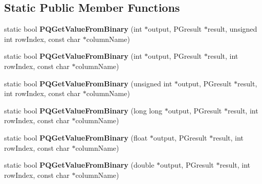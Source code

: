 \subsection*{Static Public Member Functions}
\begin{DoxyCompactItemize}
\item 
\hypertarget{class_postgre_s_q_l_interface_aa3364b9afb4acf6e5d3fc3a25d06094c}{static bool {\bfseries P\-Q\-Get\-Value\-From\-Binary} (int $\ast$output, P\-Gresult $\ast$result, unsigned int row\-Index, const char $\ast$column\-Name)}\label{class_postgre_s_q_l_interface_aa3364b9afb4acf6e5d3fc3a25d06094c}

\item 
\hypertarget{class_postgre_s_q_l_interface_a85cbefe8d04c7b73ce17013965c43077}{static bool {\bfseries P\-Q\-Get\-Value\-From\-Binary} (int $\ast$output, P\-Gresult $\ast$result, int row\-Index, const char $\ast$column\-Name)}\label{class_postgre_s_q_l_interface_a85cbefe8d04c7b73ce17013965c43077}

\item 
\hypertarget{class_postgre_s_q_l_interface_a856e8b1615b1b1462cb8984a82663861}{static bool {\bfseries P\-Q\-Get\-Value\-From\-Binary} (unsigned int $\ast$output, P\-Gresult $\ast$result, int row\-Index, const char $\ast$column\-Name)}\label{class_postgre_s_q_l_interface_a856e8b1615b1b1462cb8984a82663861}

\item 
\hypertarget{class_postgre_s_q_l_interface_a2a78c3d71b28f7eb0332b566a9105d15}{static bool {\bfseries P\-Q\-Get\-Value\-From\-Binary} (long long $\ast$output, P\-Gresult $\ast$result, int row\-Index, const char $\ast$column\-Name)}\label{class_postgre_s_q_l_interface_a2a78c3d71b28f7eb0332b566a9105d15}

\item 
\hypertarget{class_postgre_s_q_l_interface_a961de63e792b5161141c8c3f30b0e635}{static bool {\bfseries P\-Q\-Get\-Value\-From\-Binary} (float $\ast$output, P\-Gresult $\ast$result, int row\-Index, const char $\ast$column\-Name)}\label{class_postgre_s_q_l_interface_a961de63e792b5161141c8c3f30b0e635}

\item 
\hypertarget{class_postgre_s_q_l_interface_a5293404d7c822fa3aacf7708852939b7}{static bool {\bfseries P\-Q\-Get\-Value\-From\-Binary} (double $\ast$output, P\-Gresult $\ast$result, int row\-Index, const char $\ast$column\-Name)}\label{class_postgre_s_q_l_interface_a5293404d7c822fa3aacf7708852939b7}


\end{DoxyCompactItemize}
